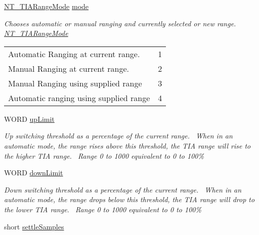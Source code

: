\begin{DoxyCompactItemize}
\item 
\hyperlink{group___common_ga17a2e7154218bc950c0568a08a1307a8}{N\+T\+\_\+\+T\+I\+A\+Range\+Mode} \hyperlink{struct_n_t___t_i_a_range_parameters_af49ed5d87f7abee7308231db54cfc20e}{mode}
\begin{DoxyCompactList}\small\item\em Chooses automatic or manual ranging and currently selected or new range. \hyperlink{group___common_ga17a2e7154218bc950c0568a08a1307a8}{N\+T\+\_\+\+T\+I\+A\+Range\+Mode} \tabulinesep=1mm
\begin{longtabu} spread 0pt [c]{*2{|X[-1]}|}
\hline
Automatic Ranging at current range.&1 \\
Manual Ranging at current range.&2 \\
Manual Ranging using supplied range&3 \\
Automatic ranging using supplied range&4 \\
\end{longtabu}
\end{DoxyCompactList}\item 
W\+O\+RD \hyperlink{struct_n_t___t_i_a_range_parameters_a7982ed805a6dc128de98b5685f748bbc}{up\+Limit}
\begin{DoxyCompactList}\small\item\em Up switching threshold as a percentage of the current range.~\newline
 When in an automatic mode, the range rises above this threshold, the T\+IA range will rise to the higher T\+IA range.~\newline
 Range 0 to 1000 equivalent to 0 to 100\% \end{DoxyCompactList}\item 
W\+O\+RD \hyperlink{struct_n_t___t_i_a_range_parameters_afd12c6ffce2da5fcd745f603e97cf71b}{down\+Limit}
\begin{DoxyCompactList}\small\item\em Down switching threshold as a percentage of the current range.~\newline
 When in an automatic mode, the range drops below this threshold, the T\+IA range will drop to the lower T\+IA range.~\newline
 Range 0 to 1000 equivalent to 0 to 100\% \end{DoxyCompactList}\item 
short \hyperlink{struct_n_t___t_i_a_range_parameters_ad242d8b828e74ea7aa1135b5e5b9126f}{settle\+Samples}

\end{DoxyCompactItemize}
